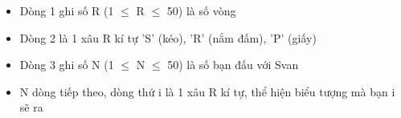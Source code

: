\begin{itemize}
	\item Dòng 1 ghi số R (1  $\le$  R  $\le$  50) là số vòng
	\item Dòng 2 là 1 xâu R kí tự 'S' (kéo), 'R' (nắm đấm), 'P' (giấy)
	\item Dòng 3 ghi số N (1  $\le$  N  $\le$  50) là số bạn đấu với Svan
	\item N dòng tiếp theo, dòng thứ i là 1 xâu R kí tự, thể hiện biểu tượng mà bạn i sẽ ra
\end{itemize}